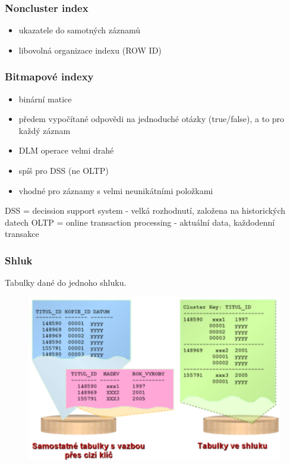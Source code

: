\documentclass{szzclass}
\begin{document}
\subsubsection{Noncluster index}
\begin{itemize}
  \item ukazatele do samotných záznamů
  \item libovolná organizace indexu (ROW ID)
\end{itemize}
\subsubsection{Bitmapové indexy}
\begin{itemize}
  \item binární matice
  \item předem vypočítané odpovědi na jednoduché otázky (true/false), a to pro každý záznam
  \item DLM operace velmi drahé
  \item spíš pro DSS (ne OLTP)
  \item vhodné pro záznamy s velmi neunikátními položkami
\end{itemize}
DSS = decission support system - velká rozhodnutí, založena na historických datech \newline
OLTP = online transaction processing - aktuální data, každodenní transakce
\subsubsection{Shluk}
Tabulky dané do jednoho shluku.
\begin{figure}[h!]
  \centering
  \includegraphics[width = \textwidth]{topics/bi-spol-11/images/cluster.png}
\end{figure}
\end{document}
